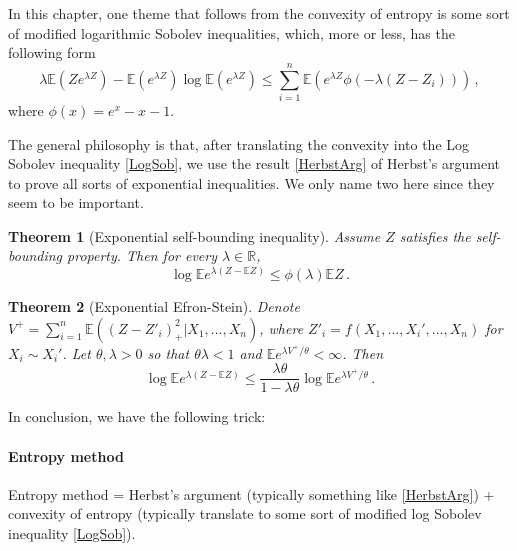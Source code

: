 \documentclass{amsproc}
\newtheorem{theorem}{Theorem}
\newcommand{\R}{\mathbb{R}}
\newcommand{\E}{\mathbb{E}} %
\begin{document}
In this chapter, one theme that follows from the convexity of entropy is some
sort of modified logarithmic Sobolev inequalities, which, more or less, has 
the following form
\begin{equation} \label{LogSob}
  \lambda \E ( Ze^{\lambda Z}) - \E( e^{\lambda Z})\log \E(e^{\lambda Z}) \leq
  \sum_{i=1}^n \E (e^{\lambda Z} \phi( - \lambda (Z-Z_i))) \,,
\end{equation}
where $\phi(x) = e^x - x -1$.

The general philosophy is that, after translating the convexity into the Log
Sobolev inequality \eqref{LogSob}, we use the result \eqref{HerbstArg} of
Herbst's argument to prove all sorts of exponential inequalities. We only name
two here since they seem to be important.

\begin{theorem}[Exponential self-bounding
  inequality]\label{thm:expSelfBounding}
  Assume $Z$ satisfies the self-bounding property. Then for every $\lambda \in
  \R$, 
  \begin{equation*}
    \log \E e^{\lambda(Z - \E Z)} \leq \phi(\lambda) \E Z \,.
  \end{equation*}

\end{theorem}

\begin{theorem}[Exponential Efron-Stein] \label{thm:expEfronStein}
  Denote $V^+ = \sum_{i=1}^n \E((Z - Z'_i)_+^2 | X_1,..., X_n)$, where $Z'_i =
  f(X_1,..., X_i',..., X_n)$ for $X_i \sim X_i'$.
  Let $\theta, \lambda >0$ so that $\theta\lambda <1$ and $\E e^{\lambda
  V^+/\theta} <\infty$. Then 
  \begin{equation*}
    \log \E e^{\lambda(Z -\E Z)} \leq \frac{\lambda \theta}{1- \lambda
      \theta}\log \E e^{\lambda V^+/\theta} \,.
  \end{equation*}
\end{theorem}  

In conclusion, we have the following trick:

\paragraph{ \bf Entropy method } \label{rmk:EntMet}

Entropy method = Herbst's argument (typically something like \eqref{HerbstArg})
+ convexity of entropy (typically translate to some sort of modified log
Sobolev inequality \eqref{LogSob}).


\end{document}
